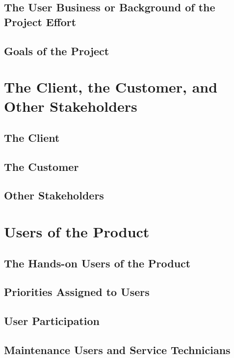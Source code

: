 \documentclass{scrreprt}
\begin{document}
\subsection{The User Business or Background of the Project Effort}

\subsection{Goals of the Project}

\section{The Client, the Customer, and Other Stakeholders}

\subsection{The Client}

\subsection{The Customer}

\subsection{Other Stakeholders}

\section{Users of the Product}

\subsection{The Hands-on Users of the Product}

\subsection{Priorities Assigned to Users}

\subsection{User Participation}

\subsection{Maintenance Users and Service Technicians}
\end{document}

